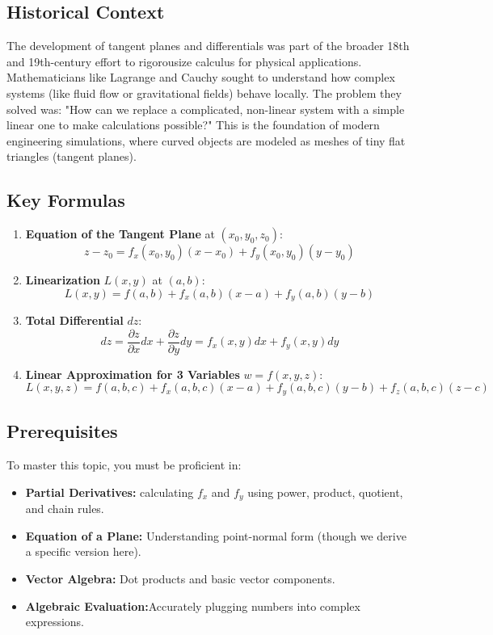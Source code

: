 \documentclass{article}
\begin{document}
\subsection{Historical Context}
The development of tangent planes and differentials was part of the broader 18th and 19th-century effort to rigorousize calculus for physical applications. Mathematicians like Lagrange and Cauchy sought to understand how complex systems (like fluid flow or gravitational fields) behave locally. The problem they solved was: "How can we replace a complicated, non-linear system with a simple linear one to make calculations possible?" This is the foundation of modern engineering simulations, where curved objects are modeled as meshes of tiny flat triangles (tangent planes).

\subsection{Key Formulas}
\begin{enumerate}
    \item \textbf{Equation of the Tangent Plane} at $(x_0, y_0, z_0)$:
    \[ z - z_0 = f_x(x_0, y_0)(x - x_0) + f_y(x_0, y_0)(y - y_0) \]
    
    \item \textbf{Linearization} $L(x, y)$ at $(a, b)$:
    \[ L(x, y) = f(a, b) + f_x(a, b)(x - a) + f_y(a, b)(y - b) \]
    
    \item \textbf{Total Differential} $dz$:
    \[ dz = \frac{\partial z}{\partial x} dx + \frac{\partial z}{\partial y} dy = f_x(x, y) dx + f_y(x, y) dy \]
    
    \item \textbf{Linear Approximation for 3 Variables} $w = f(x, y, z)$:
    \[ L(x, y, z) = f(a,b,c) + f_x(a,b,c)(x-a) + f_y(a,b,c)(y-b) + f_z(a,b,c)(z-c) \]
\end{enumerate}

\subsection{Prerequisites}
To master this topic, you must be proficient in:
\begin{itemize}
    \item \textbf{Partial Derivatives:} calculating $f_x$ and $f_y$ using power, product, quotient, and chain rules.
    \item \textbf{Equation of a Plane:} Understanding point-normal form (though we derive a specific version here).
    \item \textbf{Vector Algebra:} Dot products and basic vector components.
    \item \textbf{Algebraic Evaluation:}Accurately plugging numbers into complex expressions.
\end{itemize}
\end{document}
